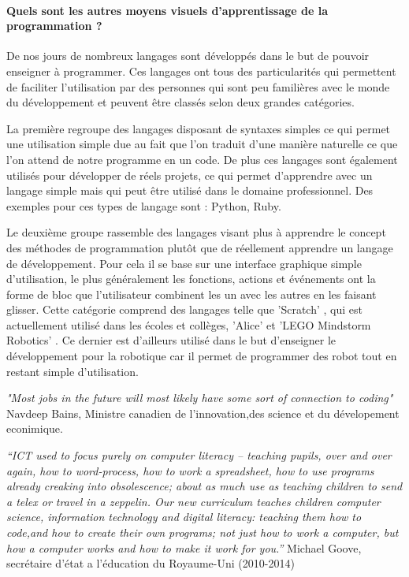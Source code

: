 \documentclass[12pt,francais]{report}
\begin{document}
\paragraph*{Quels sont les autres moyens visuels d'apprentissage de la programmation ?\\}

De nos jours de nombreux langages sont développés dans le but de pouvoir enseigner à programmer. Ces langages ont tous des particularités qui permettent de faciliter l'utilisation par des personnes qui sont peu familières avec le monde du développement et peuvent être classés selon deux grandes catégories.

La première regroupe des langages disposant de syntaxes simples ce qui permet une utilisation simple due au fait que l'on traduit d'une manière naturelle ce que l'on attend de notre programme en un code. De plus ces langages sont également utilisés pour développer de réels projets, ce qui permet d'apprendre avec un langage simple mais qui peut être utilisé dans le domaine professionnel. Des exemples pour ces types de langage sont : Python, Ruby.

Le deuxième groupe rassemble des langages visant plus à apprendre le concept des méthodes de programmation plutôt que de réellement apprendre un langage de développement. Pour cela il se base sur une interface graphique simple d'utilisation, le plus généralement les fonctions, actions et événements ont la forme de bloc  que l'utilisateur combinent les un avec les autres en les faisant glisser. Cette catégorie comprend des langages telle que 'Scratch' \cite{ref17}, qui est actuellement utilisé dans les écoles et collèges, 'Alice' \cite{ref19} et 'LEGO Mindstorm Robotics' \cite{ref18}. Ce dernier est d'ailleurs utilisé dans le but d'enseigner le développement pour la robotique car il  permet de programmer des robot tout en restant simple d'utilisation.

\textit{"Most jobs in the future will most likely have some sort of connection to coding"}  Navdeep Bains, Ministre canadien de l'innovation,des science et du dévelopement econimique.

\textit{“ICT used to focus purely on computer literacy – teaching pupils, over and over again, how to word-process, how to work a spreadsheet, how to use programs already creaking into obsolescence; about as much use as teaching children to send a telex or travel in a zeppelin.
Our new curriculum teaches children computer science, information technology and digital literacy: teaching them how to code,and how to create their own programs; not just how to work a computer, but how a computer works and how to make it work for you.”}
Michael Goove, secrétaire d'état a l'éducation du Royaume-Uni (2010-2014) \cite{ref16}
\end{document}
